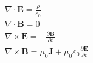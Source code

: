 
$$
\begin{array}{l}
    \nabla \cdot \mathbf{E} = \frac{\rho}{\varepsilon _0} \\
    \nabla \cdot \mathbf{B} = 0 \\
    \nabla \times \mathbf{E} = -\frac{\partial \mathbf{B}}{\partial t} \\
    \nabla \times \mathbf{B} = \mu _0 \mathbf{J} + \mu _0\varepsilon_0 \frac{\partial \mathbf{E}}{\partial t}

\end{array}
$$

